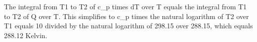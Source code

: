 The integral from T1 to T2 of c_p times dT over T equals the integral from T1 to T2 of Q over T. This simplifies to c_p times the natural logarithm of T2 over T1 equals 10 divided by the natural logarithm of 298.15 over 288.15, which equals 288.12 Kelvin.